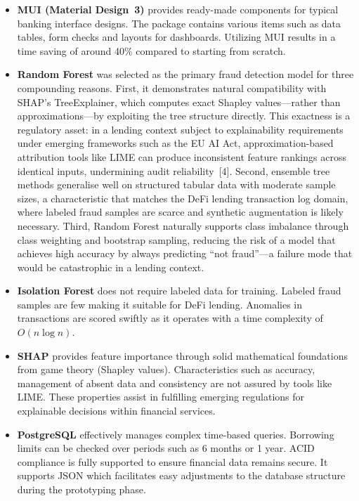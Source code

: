 \documentclass[12pt,a4paper]{report}
\begin{document}
\begin{itemize}[noitemsep]
\item \textbf{MUI (Material Design~3)} provides ready-made components for typical banking interface designs. The package contains various items such as data tables, form checks and layouts for dashboards. Utilizing MUI results in a time saving of around 40\% compared to starting from scratch.

\item \textbf{Random Forest} was selected as the primary fraud detection model for three compounding reasons. First, it demonstrates natural compatibility with SHAP's TreeExplainer, which computes exact Shapley values---rather than approximations---by exploiting the tree structure directly. This exactness is a regulatory asset: in a lending context subject to explainability requirements under emerging frameworks such as the EU AI Act, approximation-based attribution tools like LIME can produce inconsistent feature rankings across identical inputs, undermining audit reliability~[4]. Second, ensemble tree methods generalise well on structured tabular data with moderate sample sizes, a characteristic that matches the DeFi lending transaction log domain, where labeled fraud samples are scarce and synthetic augmentation is likely necessary. Third, Random Forest naturally supports class imbalance through class weighting and bootstrap sampling, reducing the risk of a model that achieves high accuracy by always predicting ``not fraud''---a failure mode that would be catastrophic in a lending context.

\item \textbf{Isolation Forest} does not require labeled data for training. Labeled fraud samples are few making it suitable for DeFi lending. Anomalies in transactions are scored swiftly as it operates with a time complexity of $O(n \log n)$.

\item \textbf{SHAP} provides feature importance through solid mathematical foundations from game theory (Shapley values). Characteristics such as accuracy, management of absent data and consistency are not assured by tools like LIME. These properties assist in fulfilling emerging regulations for explainable decisions within financial services.

\item \textbf{PostgreSQL} effectively manages complex time-based queries. Borrowing limits can be checked over periods such as 6 months or 1 year. ACID compliance is fully supported to ensure financial data remains secure. It supports JSON which facilitates easy adjustments to the database structure during the prototyping phase.


\end{itemize}
\end{document}
